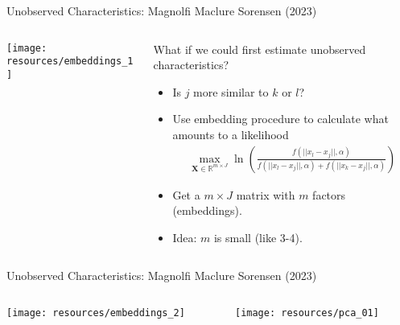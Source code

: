 \begin{frame}{Unobserved Characteristics: Magnolfi Maclure Sorensen (2023)}
\begin{columns}
\begin{column}{0.5\textwidth}
     \texttt{[image: resources/embeddings\_1]}      
\end{column}
\begin{column}{0.5\textwidth}
What if we could first estimate \alert{unobserved characteristics}?
\begin{itemize}
    \item Is $j$ more similar to $k$ or $l$?
    \item Use \alert{embedding} procedure to calculate what amounts to a likelihood
\begin{align*}
\max_{\symbf{X} \in \mathbb{R}^{m \times J}} \ln \left(\frac{f(||x_l - x_j|| ,\alpha)}{f(||x_l - x_j|| ,\alpha)+{f(||x_k - x_j|| ,\alpha)}}\right)
\end{align*}
\item Get a $m \times J$ matrix with $m$ factors (embeddings).
\item Idea: $m$ is small (like 3-4).
\end{itemize}
\end{column}
\end{columns}
\end{frame}

\begin{frame}{Unobserved Characteristics: Magnolfi Maclure Sorensen (2023)}
\begin{columns}
\begin{column}{0.5\textwidth}
     \texttt{[image: resources/embeddings\_2]}      
\end{column}
\begin{column}{0.5\textwidth}
     \texttt{[image: resources/pca\_01]}      
\end{column}
\end{columns}
\end{frame}






